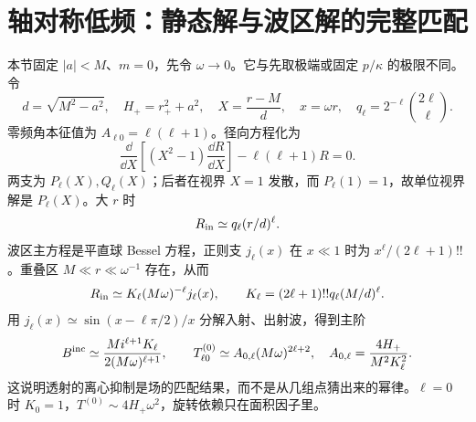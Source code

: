 \clearpage
\section{轴对称低频：静态解与波区解的完整匹配}
\label{sec:new-infrared}
本节固定 $|a|<M$、$m=0$，先令 $\omega\to0$。它与先取极端或固定 $p/\kappa$ 的极限不同。令
\begin{equation}
 d=\sqrt{M^2-a^2},\quad H_+=r_+^2+a^2,\quad
 X=\frac{r-M}{d},\quad x=\omega r,\quad
 q_\ell=2^{-\ell}\binom{2\ell}{\ell}.
\end{equation}
零频角本征值为 $A_{\ell0}=\ell(\ell+1)$。径向方程化为
\begin{equation}
 \frac{\dd}{\dd X}\left[(X^2-1)\frac{\dd R}{\dd X}\right]
 -\ell(\ell+1)R=0.
\end{equation}
两支为 $P_\ell(X),Q_\ell(X)$；后者在视界 $X=1$ 发散，而 $P_\ell(1)=1$，故单位视界解是 $P_\ell(X)$。大 $r$ 时
\begin{equation}
 R_{\rm in}\simeq q_\ell(r/d)^\ell.
\end{equation}
波区主方程是平直球 Bessel 方程，正则支 $j_\ell(x)$ 在 $x\ll1$ 时为 $x^\ell/(2\ell+1)!!$。重叠区 $M\ll r\ll\omega^{-1}$ 存在，从而
\begin{equation}
 R_{\rm in}\simeq K_\ell(M\omega)^{-\ell}j_\ell(x),\qquad
 K_\ell=(2\ell+1)!!q_\ell(M/d)^\ell.
\label{eq:new-bessel-match}
\end{equation}
用 $j_\ell(x)\simeq\sin(x-\ell\pi/2)/x$ 分解入射、出射波，得到主阶
\begin{equation}
 B^{\rm inc}\simeq\frac{M i^{\ell+1}K_\ell}{2(M\omega)^{\ell+1}},
 \qquad
 T^{(0)}_{\ell0}\simeq A_{0,\ell}(M\omega)^{2\ell+2},\quad
 A_{0,\ell}=\frac{4H_+}{M^2K_\ell^2}.
\label{eq:new-linear-low}
\end{equation}
这说明透射的离心抑制是场的匹配结果，而不是从几组点猜出来的幂律。$\ell=0$ 时 $K_0=1$，$T^{(0)}\sim4H_+\omega^2$，旋转依赖只在面积因子里。

